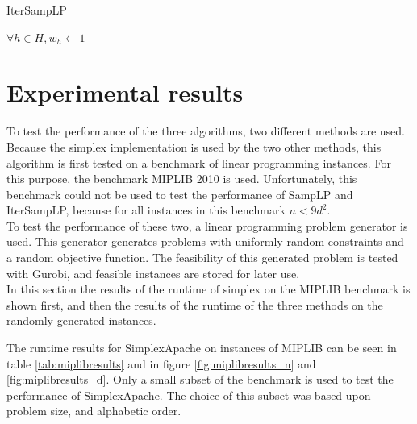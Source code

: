 \documentclass[nocopyrightspace]{acm_proc_article-sp}
\begin{document}

\begin{algorithm}[h]
\label{alg:itersamplp}
\caption{IterSampLP}
$\forall h \in H, w_h \gets 1$ \;
\end{algorithm}

\section{Experimental results}
To test the performance of the three algorithms, two different methods are used. Because the simplex implementation is used by the two other methods, this algorithm is first tested  on a benchmark of linear programming instances. For this purpose, the benchmark MIPLIB 2010 \cite{KochEtAl2011} is used. Unfortunately, this benchmark could not be used to test the performance of SampLP and IterSampLP, because for all instances in this benchmark $n < 9d^2$. \\
To test the performance of these two, a linear programming problem generator is used. This generator generates problems with uniformly random constraints and a random objective function. The feasibility of this generated problem is tested with Gurobi, and feasible instances are stored for later use. \\
In this section the results of the runtime of simplex on the MIPLIB benchmark is shown first, and then the results of the runtime of the three methods on the randomly generated instances.

The runtime results for SimplexApache on instances of MIPLIB can be seen in table \ref{tab:miplibresults} and in figure \ref{fig:miplibresults_n} and \ref{fig:miplibresults_d}. Only a small subset of the benchmark is used to test the performance of SimplexApache. The choice of this subset was based upon problem size, and alphabetic order. 
\end{document}
